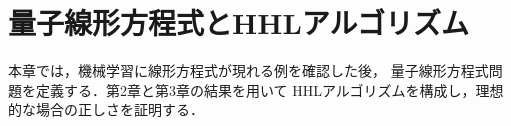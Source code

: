 \chapter{量子線形方程式とHHLアルゴリズム}
\label{chap:hhl}

本章では，機械学習に線形方程式が現れる例を確認した後，
量子線形方程式問題を定義する．第2章と第3章の結果を用いて
HHLアルゴリズムを構成し，理想的な場合の正しさを証明する．









